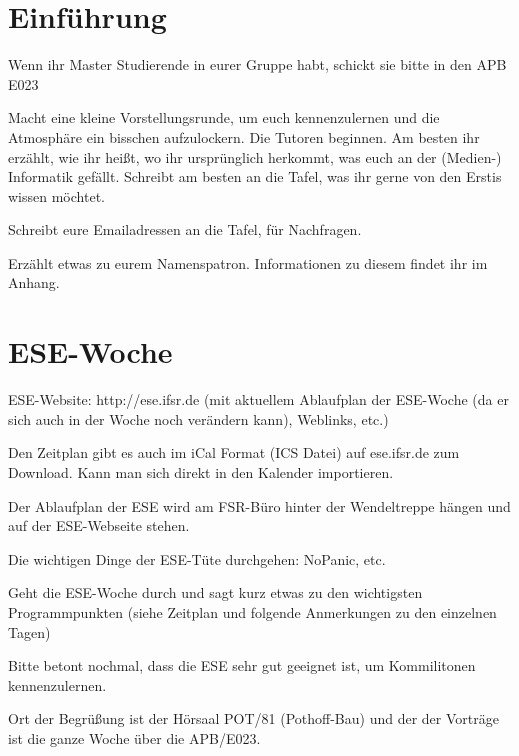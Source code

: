 \documentclass[a4paper,12pt]{report}
\begin{document}
\section{Einführung}
\begin{itemize*}
\item Wenn ihr Master Studierende in eurer Gruppe habt, schickt sie bitte in den APB E023
\item Macht eine kleine Vorstellungsrunde, um euch kennenzulernen und die Atmosphäre ein bisschen aufzulockern.
Die Tutoren beginnen.
Am besten ihr erzählt, wie ihr heißt, wo ihr ursprünglich herkommt, was euch an der (Medien-) Informatik gefällt.
Schreibt am besten an die Tafel, was ihr gerne von den Erstis wissen möchtet.
\item Schreibt eure Emailadressen an die Tafel, für Nachfragen.
\item Erzählt etwas zu eurem Namenspatron. Informationen zu diesem findet ihr im Anhang.
\end{itemize*}

\section{ESE-Woche}
\begin{itemize*}
\item ESE-Website: http://ese.ifsr.de (mit aktuellem Ablaufplan der ESE-Woche (da er sich auch in der Woche noch verändern kann), Weblinks, etc.)
\item Den Zeitplan gibt es auch im iCal Format (ICS Datei) auf ese.ifsr.de zum Download.
Kann man sich direkt in den Kalender importieren.
\item Der Ablaufplan der ESE wird am FSR-Büro hinter der Wendeltreppe hängen und auf der ESE-Webseite stehen.
\item Die wichtigen Dinge der ESE-Tüte durchgehen: NoPanic, etc.
\item Geht die ESE-Woche durch und sagt kurz etwas zu den wichtigsten Programmpunkten (siehe Zeitplan und folgende Anmerkungen zu den einzelnen Tagen)
\item Bitte betont nochmal, dass die ESE sehr gut geeignet ist, um Kommilitonen kennenzulernen.
\end{itemize*}
\vspace{0.5cm}
Ort der Begrüßung ist der Hörsaal POT/81 (Pothoff-Bau) und der der Vorträge ist die ganze Woche über die APB/E023.
\end{document}
